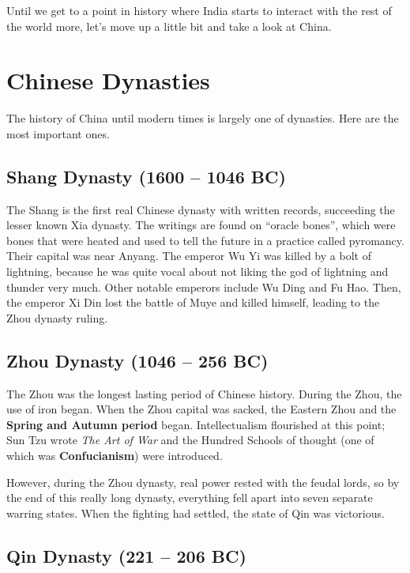 Until we get to a point in history where India starts to interact with the rest of the world more,
let's move up a little bit and take a look at China.

\section{Chinese Dynasties}

The history of China until modern times is largely one of dynasties.
Here are the most important ones.

\subsection*{Shang Dynasty (1600 -- 1046 BC)}

The Shang is the first real Chinese dynasty with written records,
succeeding the lesser known Xia dynasty.
The writings are found on ``oracle bones'',
which were bones that were heated and used to tell the future in a practice called pyromancy.
Their capital was near Anyang.
The emperor Wu Yi was killed by a bolt of lightning,
because he was quite vocal about not liking the god of lightning and thunder very much.
Other notable emperors include Wu Ding and Fu Hao.
Then, the emperor Xi Din lost the battle of Muye and killed himself,
leading to the Zhou dynasty ruling.

\subsection*{Zhou Dynasty (1046 -- 256 BC)}

The Zhou was the longest lasting period of Chinese history.
During the Zhou, the use of iron began.
When the Zhou capital was sacked, the Eastern Zhou and the \textbf{Spring and Autumn period} began.
Intellectualism flourished at this point;
Sun Tzu wrote \textit{The Art of War}
and the Hundred Schools of thought (one of which was \textbf{Confucianism}) were introduced.

However, during the Zhou dynasty, real power rested with the feudal lords, so
by the end of this really long dynasty,
everything fell apart into seven separate warring states.
When the fighting had settled, the state of Qin was victorious.

\subsection*{Qin Dynasty (221 -- 206 BC)}

